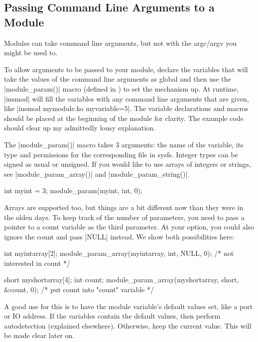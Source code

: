 \documentclass[10pt, oneside]{book}
\begin{document}

\subsection{Passing Command Line Arguments to a Module}
\label{sec:modparam}
Modules can take command line arguments, but not with the argc/argv you might be used to.

To allow arguments to be passed to your module, declare the variables that will take the values of the command line arguments as global and then use the \cpp|module_param()| macro (defined in ) to set the mechanism up.
At runtime, \sh|insmod| will fill the variables with any command line arguments that are given, like \sh|insmod mymodule.ko myvariable=5|.
The variable declarations and macros should be placed at the beginning of the module for clarity.
The example code should clear up my admittedly lousy explanation.

The \cpp|module_param()| macro takes 3 arguments: the name of the variable, its type and permissions for the corresponding file in sysfs.
Integer types can be signed as usual or unsigned. If you would like to use arrays of integers or strings,
see \cpp|module_param_array()| and \cpp|module_param_string()|.

\begin{code}
int myint = 3;
module_param(myint, int, 0);
\end{code}

Arrays are supported too, but things are a bit different now than they were in the olden days.
To keep track of the number of parameters, you need to pass a pointer to a count variable as the third parameter.
At your option, you could also ignore the count and pass \cpp|NULL| instead.
We show both possibilities here:

\begin{code}
int myintarray[2];
module_param_array(myintarray, int, NULL, 0); /* not interested in count */

short myshortarray[4];
int count;
module_param_array(myshortarray, short, &count, 0); /* put count into "count" variable */
\end{code}

A good use for this is to have the module variable's default values set, like a port or IO address.
If the variables contain the default values, then perform autodetection (explained elsewhere).
Otherwise, keep the current value.
This will be made clear later on.
\end{document}
